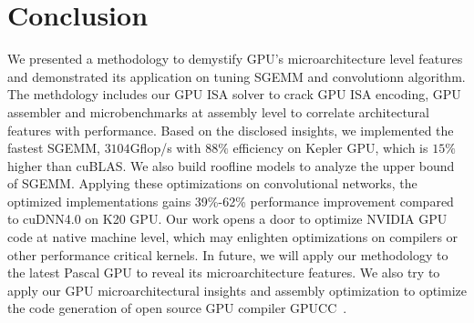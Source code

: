 \section{Conclusion}
\label{sec:conclusion}
We presented a methodology to demystify GPU's microarchitecture level features and demonstrated its 
application on tuning SGEMM and convolutionn algorithm. 
The methdology includes our GPU ISA solver to crack GPU ISA encoding, GPU
assembler and microbenchmarks at assembly level to correlate architectural
features with performance.
Based on the disclosed insights, we implemented the
fastest SGEMM,  $3104$Gflop/s with $88\%$ efficiency on Kepler GPU, which is $15\%$ higher than cuBLAS. 
We also build roofline models to analyze the upper bound of SGEMM. 
Applying these optimizations on convolutional networks, the optimized implementations gains 39\%-62\% performance improvement
compared to cuDNN4.0 on K20 GPU.
Our work opens a door to optimize NVIDIA GPU code at native machine level, which may enlighten optimizations on
compilers or other performance critical kernels.
In future, we will apply our methodology to the latest Pascal GPU to reveal its microarchitecture features.
We also try to apply our GPU microarchitectural insights and assembly
optimization to optimize the code generation of open source GPU compiler
GPUCC~\cite{wu2016gpucc}.
